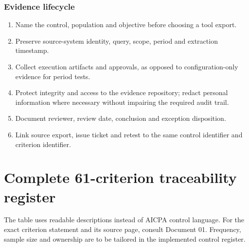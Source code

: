 \documentclass[10pt,oneside]{report}
\begin{document}
\subsection{Evidence lifecycle}
\begin{enumerate}
\item Name the control, population and objective before choosing a tool export.
\item Preserve source-system identity, query, scope, period and extraction timestamp.
\item Collect execution artifacts and approvals, as opposed to configuration-only evidence for period tests.
\item Protect integrity and access to the evidence repository; redact personal information where necessary without impairing the required audit trail.
\item Document reviewer, review date, conclusion and exception disposition.
\item Link source export, issue ticket and retest to the same control identifier and criterion identifier.
\end{enumerate}

\chapter{Complete 61-criterion traceability register}
The table uses readable descriptions instead of AICPA control language. For the exact criterion statement and its source page, consult Document 01. Frequency, sample size and ownership are to be tailored in the implemented control register.
\end{document}
